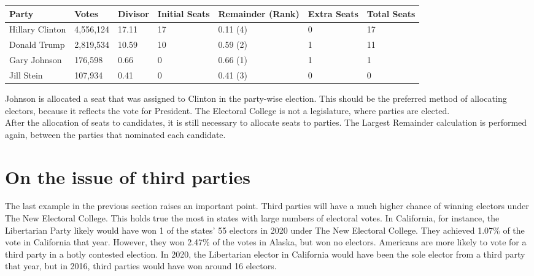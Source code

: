 \documentclass{article}
\begin{document}
    \begin{adjustbox}{center}
    \begin{tabular}{ |l|l|l|l|l|l|l| }
        \hline
        Party & Votes & Divisor & Initial Seats & Remainder (Rank) & Extra Seats & Total Seats \\
        \hline
        Hillary Clinton & 4,556,124 & 17.11 & 17 & 0.11 (4) & 0 & 17 \\
        \hline
        Donald Trump & 2,819,534 & 10.59 & 10 & 0.59 (2) & 1 & 11 \\
        \hline
        Gary Johnson & 176,598 & 0.66 & 0 & 0.66 (1) & 1 & 1 \\
        \hline
        Jill Stein & 107,934 & 0.41 & 0 & 0.41 (3) & 0 & 0 \\
        \hline
    \end{tabular}
    \end{adjustbox}

    Johnson is allocated a seat that was assigned to Clinton in the party-wise election. This should be the preferred method of allocating electors, because it reflects the vote for President. The Electoral College is not a legislature, where parties are elected.\\
    
    After the allocation of seats to candidates, it is still necessary to allocate seats to parties. The Largest Remainder calculation is performed again, between the parties that nominated each candidate.\\

    \section{On the issue of third parties}%

    The last example in the previous section raises an important point. Third parties will have a much higher chance of winning electors under The New Electoral College. This holds true the most in states with large numbers of electoral votes. In California, for instance, the Libertarian Party likely would have won 1 of the states' 55 electors in 2020 under The New Electoral College. They achieved 1.07\% of the vote in California that year. However, they won 2.47\% of the votes in Alaska, but won no electors. Americans are more likely to vote for a third party in a hotly contested election. In 2020, the Libertarian elector in California would have been the sole elector from a third party that year, but in 2016, third parties would have won around 16 electors.\\
\end{document}

